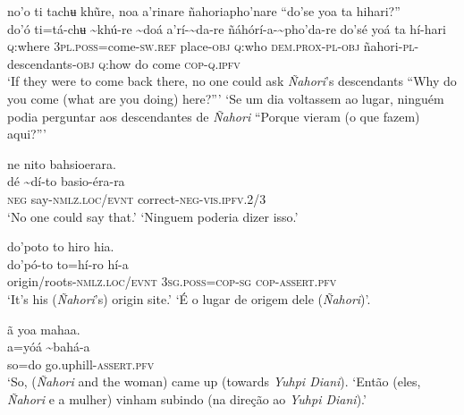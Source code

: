 \documentclass[output=paper,
modfonts,nonflat
]{langsci/langscibook}
\begin{document}
\ea no'o ti tachʉ khũre, noa a’rinare ñahoriapho'nare “do'se yoa ta hihari?” \\[.3em]
\gll {\textasciitilde}do'ó	ti=tá-chʉ	{\textasciitilde}khú-re	{\textasciitilde}doá	a’rí-{\textasciitilde}da-re	ñáhórí-a-{\textasciitilde}pho'da-re do'sé	yoá	ta	hí-hari \\
     \textsc{q}:where{\footnotemark}	3\textsc{pl.poss}=come-\textsc{sw.ref}	place\textsc{-obj}	\textsc{q:}who	\textsc{dem.prox-pl-obj}	ñahori-\textsc{pl}-descendants\textsc{-obj} \textsc{q}:how	do	come	\textsc{cop-q.ipfv} \\
\glt ‘If they were to come back there, no one could ask \textit{Ñahori}’s descendants “Why do you come (what are you doing) here?”’
\glt ‘Se um dia voltassem ao lugar, ninguém podia perguntar aos descendantes de \textit{Ñahori} “Porque vieram (o que fazem) aqui?”’
\z

\ea ne nito bahsioerara. \\[.3em]
\gll {\textasciitilde}dé	{\textasciitilde}dí-to	basio-éra-ra \\
     \textsc{neg}	say-\textsc{nmlz.loc/evnt}	correct-\textsc{neg-vis.ipfv.}2/3 \\
\glt ‘No one could say that.’ 
\glt ‘Ninguem poderia dizer isso.’
\z 

\newpage
\ea do'poto	to hiro	hia. \\[.3em]
\gll do'pó-to	to=hí-ro	hí-a \\
     origin/roots-\textsc{nmlz.loc/evnt}	3\textsc{sg.poss=cop-sg} 	\textsc{cop-assert.pfv} \\
\glt ‘It's his (\textit{Ñahori}’s) origin site.’
\glt ‘É o lugar de origem dele (\textit{Ñahori})’.
\z 


\ea ã yoa mahaa.  \\[.3em]
\gll {\textasciitilde}a=yóá	{\textasciitilde}bahá-a \\
     so=do	go.uphill-\textsc{assert.pfv} \\
\glt ‘So, (\textit{Ñahori} and the woman) came up (towards \textit{Yuhpi Diani}).
\glt ‘Então (eles, \textit{Ñahori} e a mulher) vinham subindo (na direção ao \textit{Yuhpi Diani}).’
\z 
\end{document}
